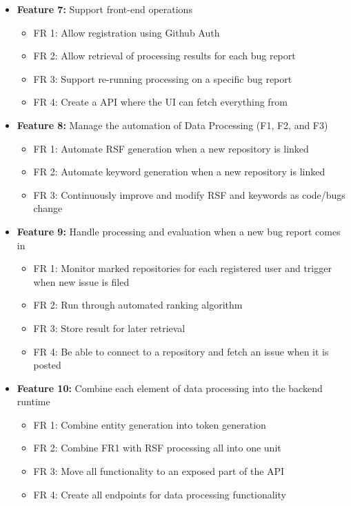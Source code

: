 \documentclass[12pt]{article}
\providecommand{\tightlist}{%
  \setlength{\itemsep}{0pt}\setlength{\parskip}{0pt}}
\begin{document}
\begin{itemize}
\tightlist
\item
  \textbf{Feature 7:} Support front-end operations

  \begin{itemize}
  \tightlist
  \item
    FR 1: Allow registration using Github Auth
  \item
    FR 2: Allow retrieval of processing results for each bug report
  \item
    FR 3: Support re-running processing on a specific bug report
  \item
    FR 4: Create a API where the UI can fetch everything from
  \end{itemize}
\item
  \textbf{Feature 8:} Manage the automation of Data Processing (F1, F2,
  and F3)

  \begin{itemize}
  \tightlist
  \item
    FR 1: Automate RSF generation when a new repository is linked
  \item
    FR 2: Automate keyword generation when a new repository is linked
  \item
    FR 3: Continuously improve and modify RSF and keywords as code/bugs
    change
  \end{itemize}
\item
  \textbf{Feature 9:} Handle processing and evaluation when a new bug
  report comes in

  \begin{itemize}
  \tightlist
  \item
    FR 1: Monitor marked repositories for each registered user and
    trigger when new issue is filed
  \item
    FR 2: Run through automated ranking algorithm
  \item
    FR 3: Store result for later retrieval
  \item
    FR 4: Be able to connect to a repository and fetch an issue when it
    is posted
  \end{itemize}
\item
  \textbf{Feature 10:} Combine each element of data processing into the
  backend runtime

  \begin{itemize}
  \tightlist
  \item
    FR 1: Combine entity generation into token generation
  \item
    FR 2: Combine FR1 with RSF processing all into one unit
  \item
    FR 3: Move all functionality to an exposed part of the API
  \item
    FR 4: Create all endpoints for data processing functionality
  \end{itemize}
\end{itemize}
\end{document}
